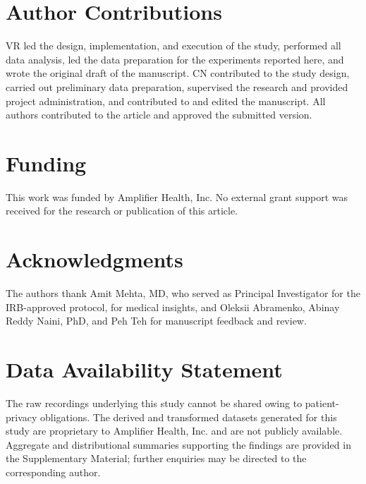 \documentclass[utf8]{FrontiersinHarvard} %
\begin{document}
\section*{Author Contributions}
VR led the design, implementation, and execution of the study, performed all data analysis, led the data preparation for the experiments reported here, and wrote the original draft of the manuscript. CN contributed to the study design, carried out preliminary data preparation, supervised the research and provided project administration, and contributed to and edited the manuscript. All authors contributed to the article and approved the submitted version.

\section*{Funding}
This work was funded by Amplifier Health, Inc. No external grant support was received for the research or publication of this article.

\section*{Acknowledgments}
The authors thank Amit Mehta, MD, who served as Principal Investigator for the IRB-approved protocol, for medical insights, and Oleksii Abramenko, Abinay Reddy Naini, PhD, and Peh Teh for manuscript feedback and review.


\section*{Data Availability Statement}
The raw recordings underlying this study cannot be shared owing to patient-privacy obligations. The derived and transformed datasets generated for this study are proprietary to Amplifier Health, Inc. and are not publicly available. Aggregate and distributional summaries supporting the findings are provided in the Supplementary Material; further enquiries may be directed to the corresponding author.


\end{document}
